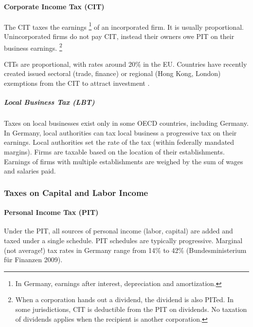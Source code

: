 \paragraph{Corporate Income Tax (CIT)}
	\label{sec:CIT}
The  \gls{CIT} taxes the earnings
\footnote{
	In Germany, earnings after interest, depreciation and amortization.
}
of an incorporated firm.
It is usually proportional.
Unincorporated firms do not pay \gls{CIT}, instead their owners owe \gls{PIT} on their business earnings.
\footnote{
	When a corporation hands out a dividend, the dividend is also \gls{PIT}ed.
	In some jurisdictions, \gls{CIT} is deductible from the \gls{PIT} on dividends.
	No taxation of dividends applies when the recipient is another corporation.
}

\glspl{CIT} are proportional, with rates around 20\% in the EU.
Countries have recently created issued sectoral (trade, finance) or regional (Hong Kong, London) exemptions from the \gls{CIT} to attract investment \citep{Genschel2009,Ganghof2007,Genschel2005}.

\subparagraph{Local Business Tax (LBT)}
	\label{sec:LBT}
Taxes on local businesses exist only in some OECD countries, including Germany.
In Germany, local authorities can tax local business a progressive tax on their earnings.
Local authorities set the rate of the tax (within federally mandated margins).
Firms are taxable based on the location of their establishments.
Earnings of firms with multiple establishments are weighed by the sum of wages and salaries paid.

\subsubsection{Taxes on Capital and Labor Income}

\paragraph{Personal Income Tax (PIT)}
	\label{sec:PIT}
Under the  \gls{PIT}, all sources of personal income (labor, capital) are added and taxed under a single schedule.
\gls{PIT} schedules are typically progressive.
Marginal (not average!) tax rates in Germany range from 14\% to 42\% (Bundesministerium für Finanzen 2009).

